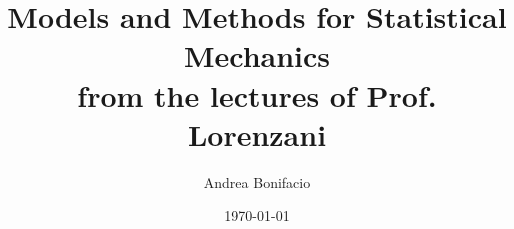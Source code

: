 \documentclass[a4paper,11pt]{article}
\theoremstyle{break}
\numberwithin{equation}{section}
\begin{document}
\title{Models and Methods for Statistical Mechanics \\
\small from the lectures of Prof. Lorenzani}
\author{Andrea Bonifacio}
\date{\today}
\maketitle

\end{document}
